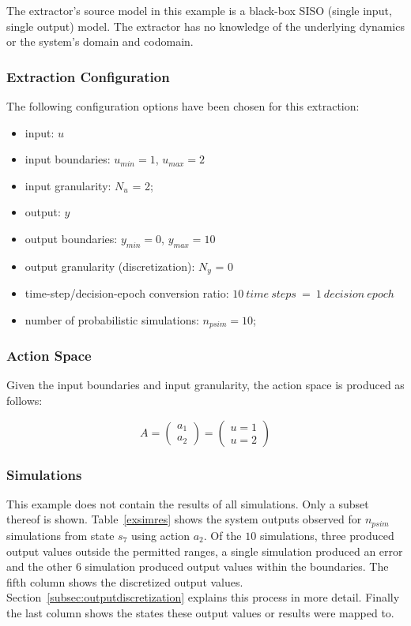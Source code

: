 The extractor's source model in this example is a black-box SISO (single input, single output) model. The extractor has no knowledge of the underlying dynamics or the system's domain and codomain.

\subsubsection{Extraction Configuration}
\label{subsubsec:extractionconfig}

The following configuration options have been chosen for this extraction:

\begin{itemize}
\item input: $u$
\item input boundaries: $u_{min} = 1$, $u_{max} = 2$
\item input granularity: $N_u$ = 2;
\item output: $y$
\item output boundaries: $y_{min} = 0$, $y_{max} = 10$
\item output granularity (discretization): $N_y$ = 0
\item time-step/decision-epoch conversion ratio: $10\ time\ steps\ =\ 1\ decision\ epoch$
\item number of probabilistic simulations: $n_{psim} = 10$;
\end{itemize}

\subsubsection{Action Space}

Given the input boundaries and input granularity, the action space is produced as follows:

\[
A = \begin{pmatrix} a_1 \\ a_2 \end{pmatrix}
 = \begin{pmatrix} u = 1 \\ u = 2 \end{pmatrix}
\]

\subsubsection{Simulations}

This example does not contain the results of all simulations. Only a subset thereof is shown. Table~\ref{exsimres} shows the system outputs observed for $n_{psim}$ simulations from state $s_7$ using action $a_2$. Of the $10$ simulations, three produced output values outside the permitted ranges, a single simulation produced an error and the other $6$ simulation produced output values within the boundaries. The fifth column shows the discretized output values. Section~\ref{subsec:outputdiscretization} explains this process in more detail. Finally the last column shows the states these output values or results were mapped to.

